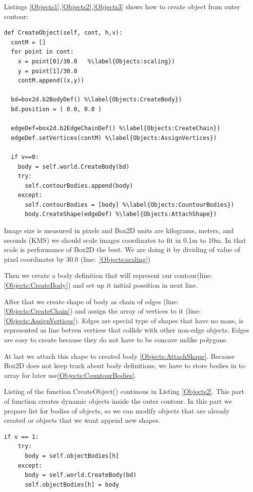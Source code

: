 \documentclass{ifacconf}
\begin{document}
Listings \ref{Objects1},\ref{Objects2},\ref{Objects3} shows how to create object
from outer contour:
\begin{lstlisting}[name=Objects,label=Objects1,caption=Creation of object from
outer contour]
def CreateObject(self, cont, h,v):
  contM = []
  for point in cont:
    x = point[0]/30.0	%\label{Objects:scaling})
    y = point[1]/30.0
    contM.append((x,y))
    
  bd=box2d.b2BodyDef() %\label{Objects:CreateBody})
  bd.position = ( 0.0, 0.0 )
  
  edgeDef=box2d.b2EdgeChainDef() %\label{Objects:CreateChain})
  edgeDef.setVertices(contM) %\label{Objects:AssignVertices})

  if v==0:
    body = self.world.CreateBody(bd)
    try:
      self.contourBodies.append(body)
    except:
      self.contourBodies = [body] %\label{Objects:CountourBodies})
      body.CreateShape(edgeDef) %\label{Objects:AttachShape})
\end{lstlisting}
Image size is measured in pixels and Box2D units are kilograms, meters,
and seconds (KMS) we should scale images coordinates to fit in 0.1m to
10m. In that scale is performance of Box2D the best. We are doing it by
dividing of value of pixel coordinates by 30.0 (line:~\ref{Objects:scaling})

Then we create a body definition that will represent our contour(line:~
\ref{Objects:CreateBody}) and set up it initial possition in next line.

After that we create shape of body as chain of edges (line:~
\ref{Objects:CreateChain}) and assign the array of vertices to it (line:~
\ref{Objects:AssignVertices}). Edges are special type of shapes that have no
mass, is represented as line betven vertices that collide with other non-edge
objects. Edges are easy to create because they do not have to be concave unlike
polygons.

At last we attach this shape to created body \ref{Objects:AttachShape}. Because
Box2D does not keep track about body definitions, we have to store bodies in to
array for later use\ref{Objects:CountourBodies}.

Listing of the function CreateObject() continous in Listing \ref{Objects2}. This
part of function creates dynamic objects inside the outer contour. In this part
we prepare list for bodies of objects, so we can modify objects that are already
created or objects that we want append new shapes.
\begin{lstlisting}[name=Objects,firstnumber=auto,label=Objects2,caption=Creation of objects] if v == 1:
    try:
      body = self.objectBodies[h]
    except:
      body = self.world.CreateBody(bd)
      self.objectBodies[h] = body
\end{lstlisting}
\end{document}
